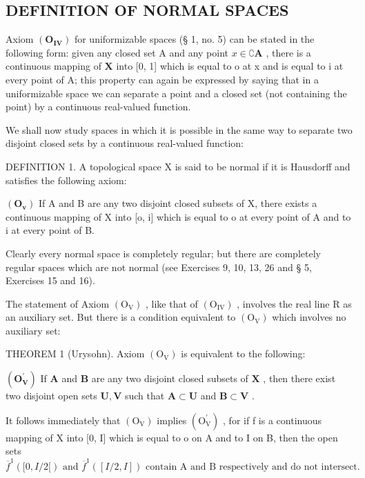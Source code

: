 \subsection{DEFINITION OF NORMAL SPACES}

Axiom \((\mathbf{O}_{\mathbf{IV}})\) for uniformizable spaces (§ 1, no. 5) can be stated in the following form: given any closed set A and any point \(x \in \complement \mathbf{A}\) , there is a continuous mapping of \(\mathbf{X}\) into {[}0, 1{]} which is equal to o at x and is equal to i at every point of A; this property can again be expressed by saying that in a uniformizable space we can separate a point and a closed set (not containing the point) by a continuous real-valued function.

We shall now study spaces in which it is possible in the same way to separate two disjoint closed sets by a continuous real-valued function:

DEFINITION 1. A topological space X is said to be normal if it is Hausdorff and satisfies the following axiom:

\((\mathbf{O}_{\mathbf{v}})\) If A and B are any two disjoint closed subsets of X, there exists a continuous mapping of X into {[}o, i{]} which is equal to o at every point of A and to i at every point of B.

Clearly every normal space is completely regular; but there are completely regular spaces which are not normal (see Exercises 9, 10, 13, 26 and § 5, Exercises 15 and 16).

The statement of Axiom \((\mathrm{O}_{\mathrm{V}})\) , like that of \((\mathrm{O}_{\mathrm{IV}})\) , involves the real line R as an auxiliary set. But there is a condition equivalent to \((\mathrm{O}_{\mathrm{V}})\) which involves no auxiliary set:

THEOREM 1 (Urysohn). Axiom \((\mathrm{O}_{\mathrm{V}})\) is equivalent to the following:

\((\mathbf{O}_{\mathbf{V}}^{\prime})\) If \(\mathbf{A}\) and \(\mathbf{B}\) are any two disjoint closed subsets of \(\mathbf{X}\) , then there exist two disjoint open sets \(\mathbf{U}, \mathbf{V}\) such that \(\mathbf{A} \subset \mathbf{U}\) and \(\mathbf{B} \subset \mathbf{V}\) .

It follows immediately that \((\mathrm{O}_{\mathrm{V}})\) implies \((\mathrm{O}_{\mathrm{V}}^{\prime})\) , for if f is a continuous mapping of X into {[}0, I{]} which is equal to o on A and to I on B, then the open sets \(\overline{f}^{1}([0, I/2[)\text{ and }\overline{f}^{1}([I/2,I])\text{ contain A and B respectively and do not intersect.}\)

